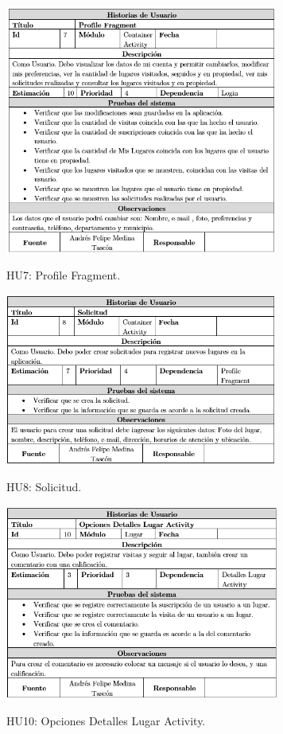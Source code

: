\documentclass[12pt,letterpaper,openany]{book}
\begin{document}
\begin{table}[H]
\centering
\includegraphics[width=9cm]{./imagenes/HU/HU7}
\caption{HU7: Profile Fragment.}
\end{table}

\begin{table}[H]
\centering
\includegraphics[width=9cm]{./imagenes/HU/HU8}
\caption{HU8: Solicitud.}
\end{table}

\begin{table}[H]
\centering
\includegraphics[width=9cm]{./imagenes/HU/HU10}
\caption{HU10: Opciones Detalles Lugar Activity.}
\end{table}
\end{document}
